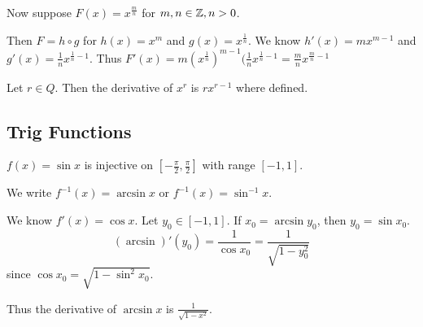 \documentclass{article}
\begin{document}
\begin{cthm}
    Now suppose $F(x) = x^{\frac{m}{n}}$ for $m, n \in \mathbb{Z}, n > 0$.

    Then $F = h \circ g$ for $h(x) = x^m$ and $g(x) = x^{\frac{1}{n}}$. We know $h'(x) = mx^{m-1}$ and $g'(x) = \frac{1}{n}x^{\frac{1}{n} - 1}$. Thus $F'(x) = m(x^{\frac{1}{n}})^{m-1} (\frac{1}{n}x^{\frac{1}{n} - 1} = \frac{m}{n}x^{\frac{m}{n} -1}$

    Let $r \in Q$. Then the derivative of $x^r$ is $rx^{r-1}$ where defined.
\end{cthm}
\subsection{Trig Functions}
\begin{example}
    $f(x) = \sin x$ is injective on $[-\frac{\pi}{2}, \frac{\pi}{2}]$ with range $[-1, 1]$.

    We write $f^{-1}(x) = \arcsin x$ or $f^{-1}(x) = \sin^{-1}x$.

    We know $f'(x) = \cos x$. Let $y_0 \in [-1, 1]$. If $x_0 = \arcsin y_0$, then $y_0 = \sin x_0$. \[
    (\arcsin)'(y_0) = \frac{1}{\cos x_0} = \frac{1}{\sqrt{1 - y_0^2}}
    \]
    since $\cos x_0 = \sqrt{1 - \sin^2 x_0}$.

    Thus the derivative of $\arcsin x$ is $\frac{1}{\sqrt{1 - x^2}}$.
\end{example}
\end{document}
